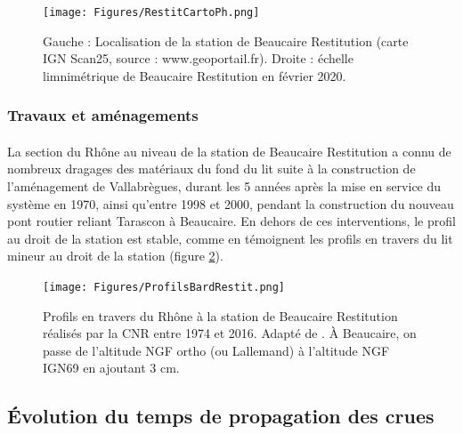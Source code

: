 \documentclass[11pt]{article}
\begin{document}
	\begin{figure}[h]
	\centering
		\texttt{[image: Figures/RestitCartoPh.png]}
        \caption{Gauche : Localisation de la station de Beaucaire Restitution (carte IGN Scan25, source : www.geoportail.fr). Droite : échelle limnimétrique de Beaucaire Restitution en février 2020.}	
		\label{fig:CartoRes}
	\end{figure}
	
	
		\subsubsection{Travaux et aménagements}

	\paragraph{} La section du Rhône au niveau de la station de Beaucaire Restitution a connu de nombreux dragages des matériaux du fond du lit suite à la construction de l'aménagement de Vallabrègues, durant les 5 années après la mise en service du système en 1970, ainsi qu'entre 1998 et 2000, pendant la construction du nouveau pont routier reliant Tarascon à Beaucaire. En dehors de ces interventions, le profil au droit de la station est stable, comme en témoignent les profils en travers du lit mineur au droit de la station (figure \ref{fig:ProfilsRestit}).
	
	\begin{figure}[h]
	\centering
		\texttt{[image: Figures/ProfilsBardRestit.png]}
        \caption{Profils en travers du Rhône à la station de Beaucaire Restitution réalisés par la CNR entre 1974 et 2016. Adapté de \citet{bard_actualisation_2018}. À Beaucaire, on passe de l'altitude NGF ortho (ou Lallemand) à l'altitude NGF IGN69 en ajoutant 3 cm.}	
		\label{fig:ProfilsRestit}
	\end{figure}
	
\FloatBarrier


\subsection{Évolution du temps de propagation des crues}
\end{document}
